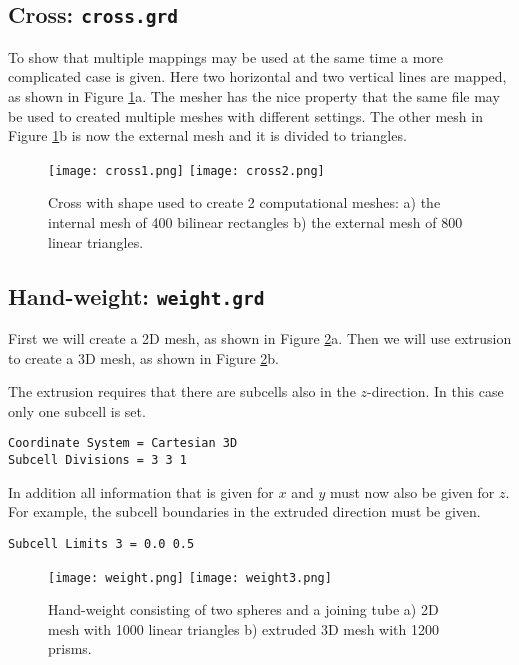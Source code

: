 \subsection*{Cross: \texttt{cross.grd}}

To show that multiple mappings may be used at the same time
a more complicated case is given. Here two horizontal and two vertical lines
are mapped, as shown in Figure \ref{fg:pic4}a. The mesher has the 
nice property that the same file may be used
to created multiple meshes with different settings. The other mesh in 
Figure \ref{fg:pic4}b is now the external mesh and it is divided to triangles.



\begin{figure}[H]
\centering
\texttt{[image: cross1.png]}
\texttt{[image: cross2.png]}
\caption{Cross with shape used to create 2 computational meshes:
      a) the internal mesh of 400 bilinear rectangles
      b) the external mesh of 800 linear triangles.}
\label{fg:pic4}
\end{figure}

\subsection*{Hand-weight: \texttt{weight.grd}}

First we will create a 2D mesh, as shown in Figure \ref{fg:pic5}a.
Then we will use extrusion to create a 3D mesh, as shown in 
Figure \ref{fg:pic5}b.


%
The extrusion requires that there are subcells also in the 
$z$-direction. In this case only one subcell is set.
\begin{verbatim}
Coordinate System = Cartesian 3D
Subcell Divisions = 3 3 1
\end{verbatim}

\noindent
In addition all information that is given for $x$ and $y$
must now also be given for $z$. For example, the 
subcell boundaries in the extruded direction must be given.
\begin{verbatim}
Subcell Limits 3 = 0.0 0.5
\end{verbatim}

\begin{figure}[H]
\centering
\texttt{[image: weight.png]} 
\texttt{[image: weight3.png]}
\caption{Hand-weight consisting of two spheres and a joining tube
      a) 2D mesh with 1000 linear triangles
	b) extruded 3D mesh with 1200 prisms.}
\label{fg:pic5}
\end{figure}



